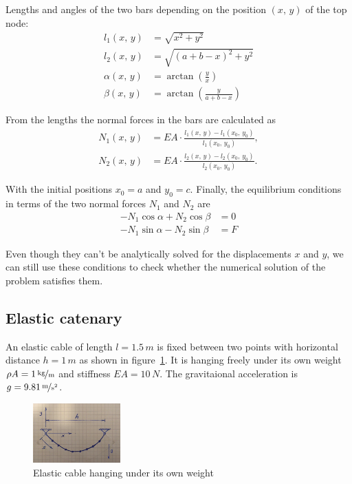 Lengths and angles of the two bars depending on the position $(x,\,y)$ of the top node:
%
\begin{align}
l_1(x,\,y) &= \sqrt{x^2 + y^2} \\
l_2(x,\,y) &= \sqrt{(a + b - x)^2 + y^2} \\
\alpha(x,\,y) &= \arctan \left( \frac{y}{x} \right) \\
\beta(x,\,y) &= \arctan \left( \frac{y}{a + b - x} \right)
\end{align}

From the lengths the normal forces in the bars are calculated as
%
\begin{align}
N_1(x,\,y) &= EA \cdot \frac{l_1(x,\,y) - l_1(x_0,\,y_0)}{l_1(x_0,\,y_0)}, \\
N_2(x,\,y) &= EA \cdot \frac{l_2(x,\,y) - l_2(x_0,\,y_0)}{l_2(x_0,\,y_0)}.
\end{align}

With the initial positions $x_0 = a$ and $y_0 = c$.
Finally, the equilibrium conditions in terms of the two normal forces $N_1$ and $N_2$ are
%
\begin{align}
-N_1 \cos{\alpha} + N_2 \cos{\beta} &= 0 \\
-N_1 \sin{\alpha} - N_2 \sin{\beta} &= F
\end{align}

Even though they can't be analytically solved for the displacements $x$ and $y$, we can still use these conditions to check whether the numerical solution of the problem satisfies them.

\newpage
\subsection*{Elastic catenary}

An elastic cable of length $l = 1.5\,\unit{m}$ is fixed between two points with horizontal distance $h = 1\,\unit{m}$ as shown in figure~\ref{fig:verification:cable-catenary}.
It is hanging freely under its own weight $\rho A = 1\,\unitfrac{kg}{m}$ and stiffness $EA = 10\,\unit{N}$.
The gravitaional acceleration is $g = 9.81\,\unitfrac{m}{s^2}$.

\begin{figure}[H]
\centering
\includegraphics[width=0.3\textwidth]{figures/verification/cable-catenary.png}
\caption{Elastic cable hanging under its own weight}
\label{fig:verification:cable-catenary}
\end{figure}

